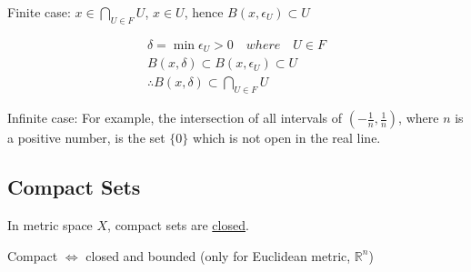 \documentclass{article}
\begin{document}
        Finite case: $x \in \bigcap_{U \in F} U$, $x \in U$, hence $B(x, \epsilon_{U}) \subset U$

        \begin{gather*}
            \delta = \min \epsilon_{U} > 0 \quad where \quad U \in F \\
            B(x, \delta) \subset B(x, \epsilon_{U}) \subset U \\
            \therefore B(x, \delta) \subset \bigcap_{U \in F} U
        \end{gather*}

        Infinite case: For example, the intersection of all intervals of $( -\frac{1}{n}, \frac{1}{n})$, where $n$ is a positive number, is the set $\{ 0 \}$ which is not open in the real line.

    \subsection{Compact Sets}

        In metric space $X$, compact sets are \underline{closed}.

        Compact $\Leftrightarrow$ closed and bounded (only for Euclidean metric, $\mathbb{R}^{n}$)
\end{document}
